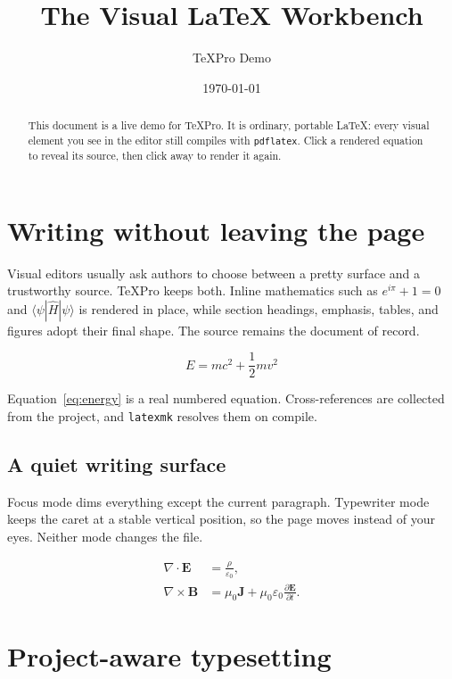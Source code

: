 \documentclass[11pt,a4paper]{article}
\title{\textbf{The Visual \LaTeX{} Workbench}}
\author{TeXPro Demo}
\date{\today}
\begin{document}
\maketitle

\begin{abstract}
This document is a live demo for TeXPro. It is ordinary, portable \LaTeX{}: every
visual element you see in the editor still compiles with \texttt{pdflatex}. Click a
rendered equation to reveal its source, then click away to render it again.
\end{abstract}

\section{Writing without leaving the page}

Visual editors usually ask authors to choose between a pretty surface and a
trustworthy source. TeXPro keeps both. Inline mathematics such as
$e^{i\pi}+1=0$ and $\langle \psi | \hat{H} | \psi \rangle$ is rendered in place,
while section headings, emphasis, tables, and figures adopt their final shape.
The source remains the document of record.

\begin{equation}
  \label{eq:energy}
  E = mc^2 + \frac{1}{2}mv^2
\end{equation}

Equation~\eqref{eq:energy} is a real numbered equation. Cross-references are
collected from the project, and \texttt{latexmk} resolves them on compile.

\subsection{A quiet writing surface}

Focus mode dims everything except the current paragraph. Typewriter mode keeps
the caret at a stable vertical position, so the page moves instead of your eyes.
Neither mode changes the file.

\begin{align}
  \nabla \cdot \mathbf{E} &= \frac{\rho}{\varepsilon_0}, \\
  \nabla \times \mathbf{B} &= \mu_0\mathbf{J}
    + \mu_0\varepsilon_0\frac{\partial \mathbf{E}}{\partial t}.
\end{align}

\section{Project-aware typesetting}
\end{document}
